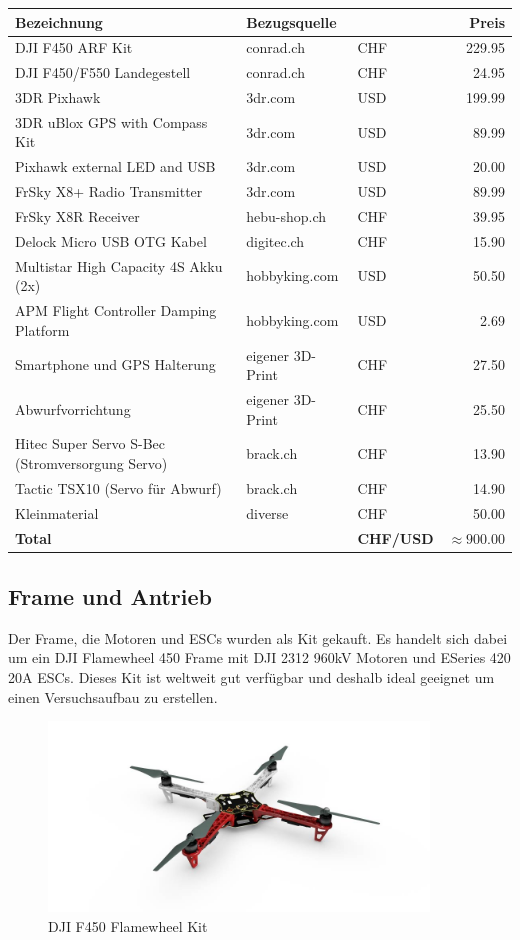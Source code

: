 \begin{tabularx}{\textwidth}{|X|l|l r|}
	\hline
	\textbf{Bezeichnung} & \textbf{Bezugsquelle} && \textbf{Preis}\\
	\hline \hline
	DJI F450 ARF Kit & conrad.ch & CHF &229.95 \\\hline
	DJI F450/F550 Landegestell & conrad.ch & CHF &24.95 \\\hline
	3DR Pixhawk & 3dr.com & USD& 199.99 \\\hline
	3DR uBlox GPS with Compass Kit & 3dr.com & USD &89.99 \\\hline
	Pixhawk external LED and USB & 3dr.com & USD & 20.00 \\\hline
	FrSky X8+ Radio Transmitter & 3dr.com & USD & 89.99 \\\hline
	FrSky X8R Receiver & hebu-shop.ch & CHF & 39.95 \\\hline
	Delock Micro USB OTG Kabel & digitec.ch & CHF &15.90 \\\hline
	Multistar High Capacity 4S Akku (2x) & hobbyking.com & USD& 50.50 \\\hline
	APM Flight Controller Damping Platform & hobbyking.com & USD& 2.69 \\\hline
	Smartphone und GPS Halterung & eigener 3D-Print & CHF &27.50\\\hline
	Abwurfvorrichtung & eigener 3D-Print & CHF &25.50\\\hline
	Hitec Super Servo S-Bec (Stromversorgung Servo) & brack.ch & CHF &13.90\\\hline
	Tactic TSX10 (Servo für Abwurf) & brack.ch & CHF & 14.90\\\hline
	Kleinmaterial & diverse & CHF & 50.00\\\hline
		\hline
	\textbf{Total} & & \textbf{CHF/USD} & $\boldsymbol{\approx 900.00}$\\\hline
\end{tabularx}

\subsection{Frame und Antrieb}

Der Frame, die Motoren und ESCs wurden als Kit gekauft. Es handelt sich dabei um ein DJI Flamewheel 450 Frame mit DJI 2312 960kV Motoren und ESeries 420 20A ESCs. Dieses Kit ist weltweit gut verfügbar und deshalb ideal geeignet um einen Versuchsaufbau zu erstellen.

\begin{figure}[h]
\centering
\includegraphics[width=0.9\textwidth] {images/hardware/f450.jpg} 
\caption{DJI F450 Flamewheel Kit}
\label{fig:f450}
\end{figure}


